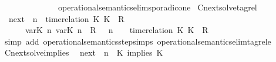 \begin{isabellebody}
\ \ \ \ \ \ \ \ \ \ \ \ \ \ operational{\isacharunderscore}semantics{\isacharunderscore}elim{\isachardot}sporadic{\isacharunderscore}on{\isacharunderscore}e{}{\isacharparenright}%
\endisatagproof
{\isafoldproof}%
%
\isadelimproof
\isanewline
%
\endisadelimproof
\isanewline
{}\isamarkupfalse%
\ Cnext{\isacharunderscore}solve{\isacharunderscore}tagrel{\isacharcolon}\isanewline
\ \ {\isacartoucheopen}{\isacharparenleft}{\isasymC}\isactrlsub n\isactrlsub e\isactrlsub x\isactrlsub t\ {\isacharparenleft}{\isasymGamma}{\isacharcomma}\ n\ {\isasymturnstile}\ {\isacharparenleft}{\isacharparenleft}time{\isacharminus}relation\ {\isasymlfloor}K\ K\ {\isasymin}\ R{\isacharparenright}\ {\isacharhash}\ {\isasymPsi}{\isacharparenright}\ {\isasymtriangleright}\ {\isasymPhi}{\isacharparenright}{\isacharparenright}\isanewline
\ \ \ \ {\isasymsupseteq}\ {\isacharbraceleft}\ {\isacharparenleft}{\isacharparenleft}{\isasymlfloor}{\isasymtau}\isactrlsub v\isactrlsub a\isactrlsub r{\isacharparenleft}K\ n{\isacharparenright}{\isacharcomma}\ {\isasymtau}\isactrlsub v\isactrlsub a\isactrlsub r{\isacharparenleft}K\ n{\isacharparenright}{\isasymrfloor}\ {\isasymin}\ R{\isacharparenright}\ {\isacharhash}\ {\isasymGamma}{\isacharparenright}{\isacharcomma}\ n\ {\isasymturnstile}\ {\isasymPsi}\ {\isasymtriangleright}\ {\isacharparenleft}{\isacharparenleft}time{\isacharminus}relation\ {\isasymlfloor}K\ K\ {\isasymin}\ R{\isacharparenright}\ {\isacharhash}\ {\isasymPhi}{\isacharparenright}\ {\isacharbraceright}{\isacartoucheclose}\isanewline
%
\isadelimproof
%
\endisadelimproof
%
\isatagproof
{}\isamarkupfalse%
\ {\isacharparenleft}simp\ add{\isacharcolon}\ operational{\isacharunderscore}semantics{\isacharunderscore}step{\isachardot}simps\ operational{\isacharunderscore}semantics{\isacharunderscore}elim{\isachardot}tagrel{\isacharunderscore}e{\isacharparenright}%
\endisatagproof
{\isafoldproof}%
%
\isadelimproof
\isanewline
%
\endisadelimproof
\isanewline
{}\isamarkupfalse%
\ Cnext{\isacharunderscore}solve{\isacharunderscore}implies{\isacharcolon}\isanewline
\ \ {\isacartoucheopen}{\isacharparenleft}{\isasymC}\isactrlsub n\isactrlsub e\isactrlsub x\isactrlsub t\ {\isacharparenleft}{\isasymGamma}{\isacharcomma}\ n\ {\isasymturnstile}\ {\isacharparenleft}{\isacharparenleft}K\ implies\ K\ {\isacharhash}\ {\isasymPsi}{\isacharparenright}\ {\isasymtriangleright}\ {\isasymPhi}{\isacharparenright}{\isacharparenright}\isanewline

\end{isabellebody}
